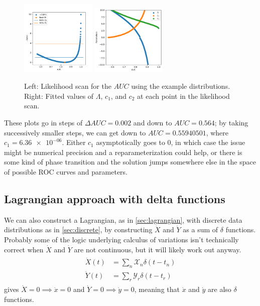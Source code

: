 \documentclass[11pt]{article}
\newcommand{\xdot}{\dot{x}}
\newcommand{\ydot}{\dot{y}}
\newcommand{\Xdot}{\dot{X}}
\newcommand{\Ydot}{\dot{Y}}
\newcommand{\AUC}{AUC}
\begin{document}
\begin{figure}
\begin{center}
\includegraphics[width=0.32\textwidth]{examplescan.pdf}
\includegraphics[width=0.32\textwidth]{exampleparameters.pdf}
\caption{Left: Likelihood scan for the \(\AUC\) using the example distributions.  Right: Fitted values of \(\Lambda\), \(c_1\), and \(c_2\) at each point in the likelihood scan.}
\label{fig:examplelikelihoodscan}
\end{center}
\end{figure}

These plots go in steps of \(\Delta\AUC=\num{0.002}\) and down to \(\AUC=\num{0.564}\); by taking successively smaller steps, we can get down to \(\AUC=\num{0.55940501}\), where \(c_1=\num{6.36e-06}\).  Either \(c_1\) asymptotically goes to 0, in which case the issue might be numerical precision and a reparameterization could help, or there is some kind of phase transition and the solution jumps somewhere else in the space of possible ROC curves and parameters.

\subsection{Lagrangian approach with delta functions}

We can also construct a Lagrangian, as in \cref{sec:lagrangian}, with discrete data distributions as in \cref{sec:discrete}, by constructing \(\Xdot\) and \(\Ydot\) as a sum of \(\delta\) functions.  Probably some of the logic underlying calculus of variations isn't technically correct when \(\Xdot\) and \(\Ydot\) are not continuous, but it will likely work out anyway.
\begin{align}
\begin{aligned}
\Xdot(t)&=\sum_n \mathscr{X}_n\delta(t-t_n) \\
\Ydot(t)&=\sum_r \mathscr{Y}_r\delta(t-t_r) \label{eq:XdotYdotdelta}
\end{aligned}
\end{align}
 gives \(\Xdot=0\implies\xdot=0\) and \(\Ydot=0\implies\ydot=0\), meaning that \(\xdot\) and \(\ydot\) are also \(\delta\) functions.
\end{document}
